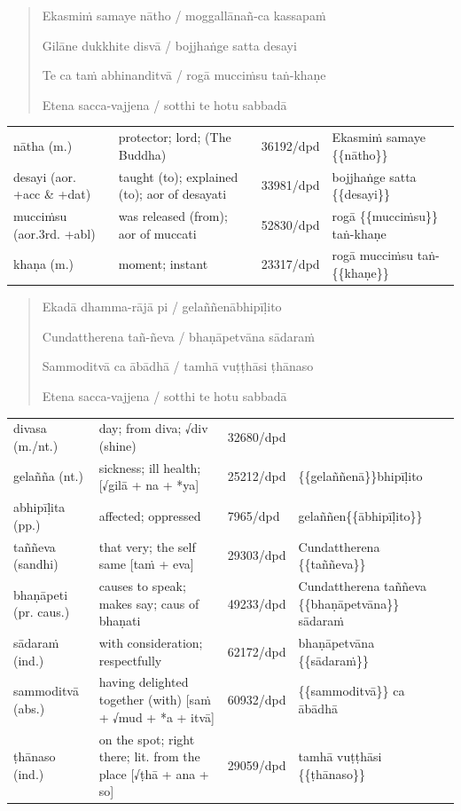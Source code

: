 \documentclass[11pt,oneside]{memoir}
\begin{document}
\begin{quote}
Ekasmiṁ samaye nātho / moggallānañ-ca kassapaṁ

Gilāne dukkhite disvā / bojjhaṅge satta desayi

Te ca taṁ abhinanditvā / rogā mucciṁsu taṅ-khaṇe

Etena sacca-vajjena / sotthi te hotu sabbadā
\end{quote}

\begin{longtable}{L{\colOne} L{\colTwo} H H}
nātha (m.) & protector; lord; (The Buddha) & 36192/dpd & Ekasmiṁ samaye \{\{nātho\}\}\\[0pt]
desayi (aor. +acc \& +dat) & taught (to); explained (to); aor of desayati & 33981/dpd & bojjhaṅge satta \{\{desayi\}\}\\[0pt]
mucciṁsu (aor.3rd. +abl) & was released (from); aor of muccati & 52830/dpd & rogā \{\{mucciṁsu\}\} taṅ-khaṇe\\[0pt]
khaṇa (m.) & moment; instant & 23317/dpd & rogā mucciṁsu taṅ-\{\{khaṇe\}\}\\[0pt]
\end{longtable}

\clearpage
\casesLegendHeaderBGHere

\begin{quote}
Ekadā dhamma-rājā pi / gelaññenābhipīḷito

Cundattherena tañ-ñeva / bhaṇāpetvāna sādaraṁ

Sammoditvā ca ābādhā / tamhā vuṭṭhāsi ṭhānaso

Etena sacca-vajjena / sotthi te hotu sabbadā
\end{quote}

\begin{longtable}{L{\colOne} L{\colTwo} H H}
divasa (m./nt.) & day; from diva; √div (shine) & 32680/dpd & \\[0pt]
gelañña (nt.) & sickness; ill health; [√gilā + na + *ya] & 25212/dpd & \{\{gelaññenā\}\}bhipīḷito\\[0pt]
abhipīḷita (pp.) & affected; oppressed & 7965/dpd & gelaññen\{\{ābhipīḷito\}\}\\[0pt]
taññeva (sandhi) & that very; the self same [taṁ + eva] & 29303/dpd & Cundattherena \{\{taññeva\}\}\\[0pt]
bhaṇāpeti (pr. caus.) & causes to speak; makes say; caus of bhaṇati & 49233/dpd & Cundattherena taññeva \{\{bhaṇāpetvāna\}\} sādaraṁ\\[0pt]
sādaraṁ (ind.) & with consideration; respectfully & 62172/dpd & bhaṇāpetvāna \{\{sādaraṁ\}\}\\[0pt]
sammoditvā (abs.) & having delighted together (with) [saṁ + √mud + *a + itvā] & 60932/dpd & \{\{sammoditvā\}\} ca ābādhā\\[0pt]
ṭhānaso (ind.) & on the spot; right there; lit. from the place [√ṭhā + ana + so] & 29059/dpd & tamhā vuṭṭhāsi \{\{ṭhānaso\}\}\\[0pt]
\end{longtable}
\end{document}

